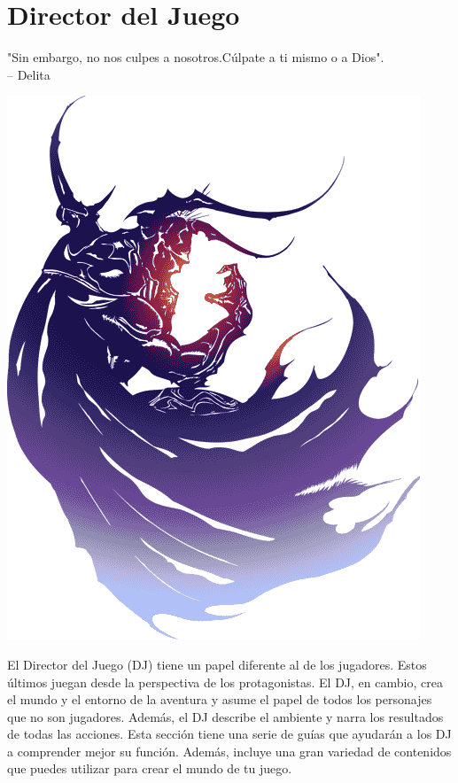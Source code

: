 \section*{\hypertarget{gm}{Director del Juego}}
"Sin embargo, no nos culpes a nosotros.\newline Cúlpate a ti mismo o a Dios".\\
\indent -- Delita

\begin{center} \includegraphics[width=\columnwidth]{./art/images/ff4.png} \end{center}
%
%
El Director del Juego (DJ) tiene un papel diferente al de los jugadores. Estos últimos juegan desde la perspectiva de los protagonistas. El DJ, en cambio, crea el mundo y el entorno de la aventura y asume el papel de todos los personajes que no son jugadores. Además, el DJ describe el ambiente y narra los resultados de todas las acciones. Esta sección tiene una serie de guías que ayudarán a los DJ a comprender mejor su función. Además, incluye una gran variedad de contenidos que puedes utilizar para crear el mundo de tu juego.

